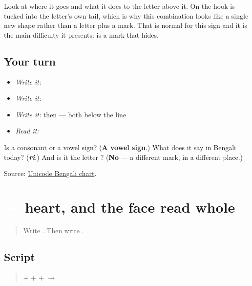 Look at where it goes and what it does to the letter above it. On \textbf{} the hook is tucked into the letter's own tail, which is why this combination looks like a single new shape rather than a letter plus a mark. That is normal for this sign and it is the main difficulty it presents: \textbf{} is a mark that hides.

\subsection*{Your turn}
\begin{itemize}
\raggedright
  \item \emph{Write it:} 
  \item \emph{Write it:} 
  \item \emph{Write it:}  then  — both below the line
  \item \emph{Read it:} 
\end{itemize}

\begin{tcolorbox}[breakable,colback=teal!4,colframe=teal!35!black,title={Before you move on}]
Is \textbf{} a consonant or a vowel sign? (\textbf{A vowel sign}.) What does it say in Bengali today? (\emph{\textbf{ri}}.) And is it the letter \textbf{}? (\textbf{No} — a different mark, in a different place.)

Source: \href{https://www.unicode.org/charts/PDF/U0980.pdf}{Unicode Bengali chart}.
\end{tcolorbox}
\section[\texorpdfstring{\bn{হৃদয়} (hridoy)}{হৃদয় (hridoy)}]{ — heart, and the face read whole}

\label{lesson:BN-W04-hridoy-read}



\begin{quote}
Write \textbf{}. Then write \textbf{}.
\end{quote}

\subsection*{Script}
\begin{quote}
\textbf{} + \textbf{} + \textbf{} + \textbf{} $\to$ \textbf{}
\end{quote}

